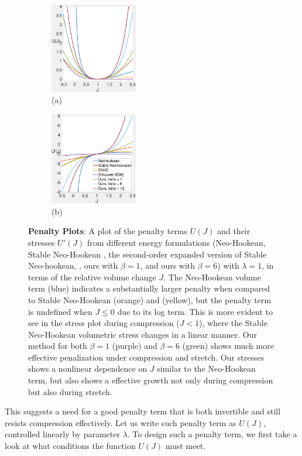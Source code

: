 \begin{figure}[t] 
	\centering
	\begin{subfigure}{.49\linewidth}
		\centering \includegraphics[width=1.5in]{images/energy_plot.pdf}
		\caption*{(a)}
		\label{sfig:energy_plot}
	\end{subfigure}%
	\begin{subfigure}{.49\linewidth}
		\centering \includegraphics[width=1.5in]{images/stress_plot.pdf}
		\caption*{(b)}
		\label{sfig:stress_plot}
	\end{subfigure}%
	\caption{\textbf{Penalty Plots}: A plot of the penalty terms $U(J)$ and their stresses $U'(J)$ from different
		energy formulations (Neo-Hookean, Stable Neo-Hookean \cite{Smith:2018}, the second-order expanded version of Stable Neo-hookean, \cite{kikuuwe:2009},
		ours with $\beta=1$, and ours with $\beta=6$) with $\lambda = 1$, in terms of the relative volume change $J$. 
		The Neo-Hookean volume term (blue) indicates a substantially larger penalty
		when compared to Stable Neo-Hookean (orange) 
		and \cite{kikuuwe:2009} (yellow), but the penalty term is undefined when $J \leq 0$ due to its log term.
		This is more evident to see in the stress plot during compression ($J < 1$), where the Stable
		Neo-Hookean volumetric stress changes in a linear manner. Our method for both $\beta=1$ (purple) and $\beta=6$ (green) shows much more effective penalization under compression and stretch. Our stresses shows a nonlinear dependence on $J$
		similar to the Neo-Hookean term, but also shows a effective growth not only during compression but also during stretch. }
	\label{fig:penalty_plots}
\end{figure}

This suggests a need for a good penalty term that is both invertible and still resists compression
effectively. Let us write such penalty term as $U(J)$, controlled linearly by parameter $\lambda$.
To design such a penalty term, we first take a look at what conditions the function $U(J)$ must
meet. 

